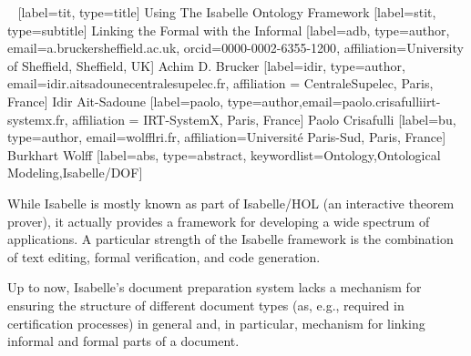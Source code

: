 %
\begin{isabellebody}%
%
%
\isadelimtheory
%
\endisadelimtheory
%
\isatagtheory
%
\endisatagtheory
{\isafoldtheory}%
%
\isadelimtheory
\ \isanewline
%
\endisadelimtheory
%
\isaDofTitle%
%
[label={tit}, type={title}]%
{Using The Isabelle Ontology Framework}%
%
\isaDofSubtitle%
%
[label={stit}, type={subtitle}]%
{Linking the Formal with the Informal}%
%
\isaDofTextAuthor%
%
[label={adb}, type={author},  email={a.brucker{\isacharat}sheffield.ac.uk},  orcid={0000-0002-6355-1200}, 
                    affiliation={University of Sheffield, Sheffield, UK}]%
{Achim D. Brucker}%
%
\isaDofTextAuthor%
%
[label={idir}, type={author}, email={idir.aitsadoune{\isacharat}centralesupelec.fr}, 
                    affiliation = {CentraleSupelec, Paris, France}]%
{Idir Ait-Sadoune}%
%
\isaDofTextAuthor%
%
[label={paolo}, type={author},email={paolo.crisafulli{\isacharat}irt-systemx.fr}, 
                    affiliation = {IRT-SystemX, Paris, France}]%
{Paolo Crisafulli}%
%
\isaDofTextAuthor%
%
[label={bu}, type={author},   email={wolff{\isacharat}lri.fr}, 
                    affiliation={Universit\'e Paris-Sud, Paris, France}]%
{Burkhart Wolff}%
%
\isaDofTextAbstract%
%
[label={abs}, type={abstract}, keywordlist={Ontology,Ontological Modeling,Isabelle/DOF}]%
{
While Isabelle is mostly known as part of Isabelle/HOL (an interactive 
theorem prover), it actually provides a framework for developing a wide
spectrum of applications. A particular strength
of the Isabelle framework is the combination of text editing, formal verification,
and code generation. 

Up to now, Isabelle's document preparation system lacks a mechanism
for ensuring the structure of different document types (as, e.g.,
required in certification processes) in general and, in particular,
mechanism for linking informal and formal parts of a document. 

}
\end{isabellebody}
